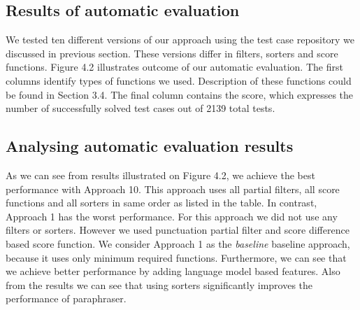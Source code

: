 \subsection{Results of automatic evaluation}

We tested ten different versions of our approach using the test case repository we discussed in previous section. These versions differ in filters, sorters and score functions. Figure 4.2 illustrates outcome of our automatic evaluation. The first columns identify types of functions we used. Description of these functions could be found in Section 3.4. The final column contains the score, which expresses the number of successfully solved test cases out of 2139 total tests.

\subsection{Analysing automatic evaluation results}

As we can see from results illustrated on Figure 4.2, we achieve the best performance with Approach 10. This approach uses all partial filters, all score functions and all sorters in same order as listed in the table. In contrast, Approach 1 has the worst performance. For this approach we did not use any filters or sorters. However we used punctuation partial filter and score difference based score function. We consider Approach 1 as the \emph{baseline} baseline approach, because it uses only minimum required functions. Furthermore, we can see that we achieve better performance by adding language model based features. Also from the results we can see that using sorters significantly improves the performance of paraphraser.


